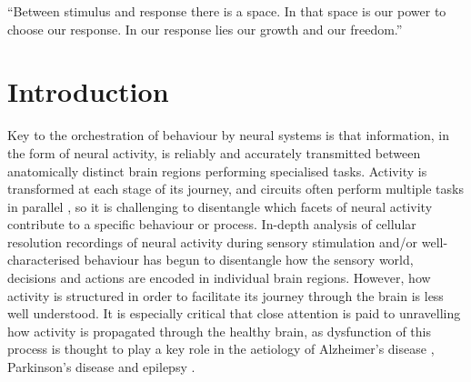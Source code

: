\begin{savequote}[8cm]
“Between stimulus and response there is a space. In that space is our power to choose our response. In our response lies our growth and our freedom.”
\end{savequote}

\chapter{\label{ch:1-intro}Introduction} 
\minitoc

Key to the orchestration of behaviour by neural systems is that information, in the form of neural activity, is reliably and accurately transmitted between anatomically distinct brain regions performing specialised tasks. Activity is transformed at each stage of its journey, and circuits often perform multiple tasks in parallel \cite{mante_context-dependent_2013, stringer_spontaneous_2019}, so it is challenging to disentangle which facets of neural activity contribute to a specific behaviour or process. In-depth analysis of cellular resolution recordings of neural activity during sensory stimulation \cite{hubel_receptive_1962, simons_response_1978, carandini_linearity_1997, okun_diverse_2015, stringer_high-dimensional_2019}  and/or well-characterised behaviour \cite{britten_analysis_1992, platt_neural_1999, yang_probabilistic_2007, herzfeld_encoding_2015, lak_dopaminergic_2020} has begun to disentangle how the sensory world, decisions and actions are encoded in individual brain regions. However, how activity is structured in order to facilitate its journey through the brain is less well understood. It is especially critical that close attention is paid to unravelling how activity is propagated through the healthy brain, as dysfunction of this process is thought to play a key role in the aetiology of Alzheimer’s disease \cite{hazra_inhibitory_2013, busche_impairments_2016}, Parkinson’s disease\cite{mcgregor_circuit_2019} and epilepsy \cite{goldberg_mechanisms_2013}.

